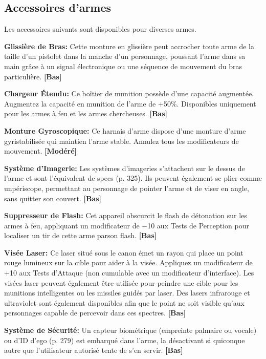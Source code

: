\subsection{Accessoires d'armes} \label{sec:weapon-accessories} 

Les accessoires suivants sont disponibles pour diverses armes. 

\textbf{Glissière de Bras:} Cette monture en glissière peut accrocher toute arme de la taille d'un pistolet dans la manche d'un personnage, poussant l'arme dans sa main grâce à un signal électronique ou une séquence de mouvement du bras particulière. \textbf{[Bas]} 

\textbf{Chargeur Étendu:} Ce boîtier de munition possède d'une capacité augmentée. Augmentez la capacité en munition de l'arme de +50\%. Disponibles uniquement pour les armes à feu et les armes chercheuses. \textbf{[Bas]} 

\textbf{Monture Gyroscopique:} Ce harnais d'arme dispose d'une monture d'arme gyristabilisée qui maintien l'arme stable. Annulez tous les modificateurs de mouvement. \textbf{[Modéré]} 

\textbf{Système d'Imagerie:} Les systèmes d'imageries s'attachent sur le dessus de l'arme et sont l'équivalent de specs (p. 325). Ils peuvent également se plier comme unpériscope, permettant au personnage de pointer l'arme et de viser en angle, sans quitter son couvert. \textbf{[Bas]} 

\textbf{Suppresseur de Flash:} Cet appareil obscurcit le flash de détonation sur les armes à feu, appliquant un modificateur de $-$10 aux Tests de Perception pour localiser un tir de cette arme parson flash. \textbf{[Bas]} 

\textbf{Visée Laser:} Ce laser situé sous le canon émet un rayon qui place un point rouge lumineux sur la cible pour aider à la visée. Appliquez un modificateur de +10 aux Tests d'Attaque (non cumulable avec un modificateur d'interface). Les visées laser peuvent également être utilisée pour peindre une cible pour les munitions intelligentes ou les missiles guidés par laser. Des lasers infrarouge et ultraviolet sont également disponibles afin que le point ne soit visible qu'aux personnages capable de percevoir dans ces spectres. \textbf{[Bas]} 

\textbf{Système de Sécurité:} Un capteur biométrique (empreinte palmaire ou vocale) ou d'ID d'ego (p. 279) est embarqué dans l'arme, la désactivant si quiconque autre que l'utilisateur autorisé tente de s'en servir. \textbf{[Bas]} 

